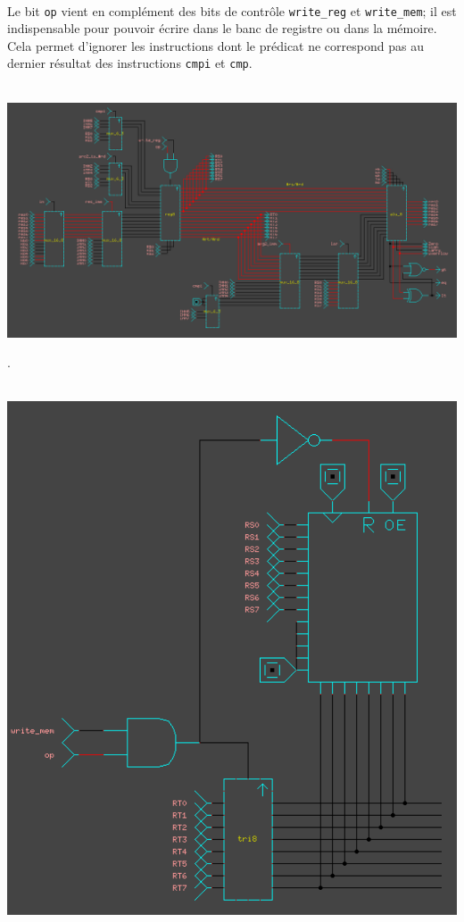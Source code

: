 \documentclass[11pt, a4paper, twoside, titlepage]{article}
\begin{document}
\paragraph{}
Le bit \texttt{op} vient en complément des bits de contrôle \texttt{write\_reg} et \texttt{write\_mem}; il est indispensable pour pouvoir écrire dans le banc de registre ou dans la mémoire. Cela permet d'ignorer les instructions dont le prédicat ne correspond pas au dernier résultat des instructions \texttt{cmpi} et \texttt{cmp}.\\
\\
\centerline{\includegraphics[width=.8 \textwidth]{proc}}
.\\
\\
\centerline{\includegraphics[scale=.5]{mgr_ram}}
\end{document}
